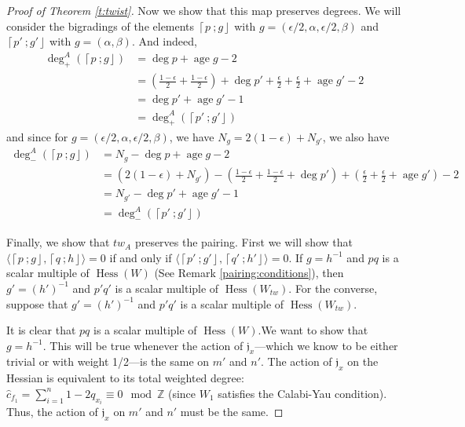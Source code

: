 \documentclass[10pt, letterpaper]{amsart}
\theoremstyle{remark}
\newcommand{\ZZ}{\mathbb{Z}}
\newcommand{\fjrw}[2]{ \left\lceil #1 \:; #2 \right\rfloor }
\newcommand{\jw}{\mathfrak{j}}
\newcommand{\tw}[1]{{#1}_{tw}}
\DeclareMathOperator{\Hess}{Hess}
\DeclareMathOperator{\age}{age}
\newcommand{\nathan}[1]{\todo[color=pistachio,fancyline]{N:#1}}
\begin{document}
\begin{proof}[Proof of Theorem \ref{t:twist}]
Now we show that this map preserves degrees.  We will consider the bigradings of the elements $\fjrw{p}{g}$ with $g=(\epsilon/2,\alpha,\epsilon/2,\beta)$ and $\fjrw{p'}{g'}$ with $g=(\alpha, \beta)$. And indeed,  
\begin{align*}
\deg^A_+(\fjrw{p}{g}) &= \deg p + \age g - 2\\  
    &= (\tfrac{1-\epsilon}{2}+\tfrac{1-\epsilon}{2})+\deg p'+\tfrac{\epsilon}{2}+\tfrac{\epsilon}{2}+\age g'-2 \\
    &= \deg p'+\age g'-1\\
    &= \deg^A_+(\fjrw{p'}{g'})
\end{align*}
and since for $g=(\epsilon/2,\alpha,\epsilon/2,\beta)$, we have $N_g=2(1-\epsilon)+N_{g'}$, we also have 
\begin{align*}
\deg^A_-(\fjrw{p}{g}) &= N_g-\deg p + \age g -2\\ 
    &= (2(1-\epsilon)+ N_{g'})-(\tfrac{1-\epsilon}{2}+\tfrac{1-\epsilon}{2}+\deg p')+(\tfrac{\epsilon}{2}+\tfrac{\epsilon}{2}+\age g')-2 \\
    &= N_{g'}-\deg p'+\age g'-1\\
    &= \deg^A_-(\fjrw{p'}{g'})
\end{align*}


Finally, we show that $tw_A$ preserves the pairing. First we will show that $\langle \fjrw{p}{g}, \fjrw{q}{h} \rangle = 0$ if and only if $\langle \fjrw{p'}{g'}, \fjrw{q'}{h'} \rangle = 0$. If $g = h^{-1}$ and $pq$ is a scalar multiple of $ \Hess(W)$ (See Remark \ref{pairing:conditions}), then $g' = (h')^{-1}$ and $p'q'$ is a scalar multiple of $\Hess(\tw{W})$. For the converse, suppose that $g' = (h')^{-1}$ and $p'q'$ is a scalar multiple of  $\Hess(\tw{W})$. 

It is clear that $pq$ is a scalar multiple of $\Hess(W)$.We want to show that $g=h^{-1}$. %
This will be true whenever the action of $\jw_x$---which we know to be either trivial or with weight 1/2---is the same on $m'$ and $n'$.  The action of $\jw_x$ on the Hessian is equivalent to its total weighted degree: $\hat{c}_{f_1} = \sum_{i=1}^n 1-2q_{x_i} \equiv 0 \mod \ZZ$ (since $W_1$ satisfies the Calabi-Yau condition). Thus, the action of $\jw_x$ on $m'$ and $n'$ must be the same. 


\end{proof}
\end{document}
